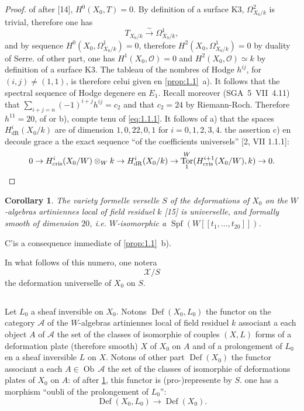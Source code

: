 \documentclass[12pt,a4paper]{article}
\theoremstyle{plain}
\newtheorem{corollary}[theorem]{Corollary}
\theoremstyle{definition}
\theoremstyle{remark}
\DeclareMathOperator{\Def}{Def}
\DeclareMathOperator{\Spf}{Spf}
\DeclareMathOperator{\Tor}{Tor}
\DeclareMathOperator{\Ob}{Ob}
\newcommand{\cris}{\mathrm{cris}}
\begin{document}
\begin{proof}
of after [14], $H^0(X_0, T) = 0$. By definition of a surface K3, $\Omega_{X_0/k}^2$ is trivial, therefore one has
\begin{equation}\label{eq:1.1.1}
T_{X_0/k} \xrightarrow{\sim} \Omega_{X_0/k}^1,
\end{equation}
and by sequence $H^0(X_0, \Omega_{X_0/k}^1) = 0$, therefore $H^2(X_0, \Omega_{X_0/k}^1) = 0$ by duality of Serre. of other part, one has $H^1(X_0, \mathcal{O}) = 0$ and $H^2(X_0, \mathcal{O}) \simeq k$ by definition of a surface K3. The tableau of the nombres of Hodge $h^{ij}$, for $(i,j) \neq (1,1)$, is therefore celui given en \ref{prop:1.1}~a). It follows that the spectral sequence of Hodge degenere en $E_1$. Recall moreover (SGA~5~VII~4.11) that $\sum_{i+j=n} (-1)^{i+j} h^{ij} = c_2$ and that $c_2 = 24$ by Riemann-Roch. Therefore $h^{11} = 20$, of or b), compte tenu of \eqref{eq:1.1.1}. It follows of a) that the spaces $H^i_{\mathrm{dR}}(X_0/k)$ are of dimension $1, 0, 22, 0, 1$ for $i = 0, 1, 2, 3, 4$. the assertion c) en decoule grace a the exact sequence ``of the coefficients universels'' [2, VII 1.1.1]:
\[
0 \to H^i_{\cris}(X_0/W) \otimes_W k \to H^i_{\mathrm{dR}}(X_0/k) \to \Tor^W_1(H^{i+1}_{\cris}(X_0/W), k) \to 0. \qedhere
\]
\end{proof}

\begin{corollary}\label{cor:1.2}
The variety formelle verselle $S$ of the deformations of $X_0$ on the $W$-algebras artiniennes local of field residuel $k$ [15] is universelle, and formally smooth of dimension $20$, i.e. $W$-isomorphic a $\Spf(W[[t_1, \ldots, t_{20}]])$.
\end{corollary}

C'is a consequence immediate of \ref{prop:1.1}~b).

In what follows of this numero, one notera
\begin{equation}\label{eq:1.3}
\mathcal{X}/S
\end{equation}
the deformation universelle of $X_0$ on $S$.

\subsection{}

Let $L_0$ a sheaf inversible on $X_0$. Notons $\Def(X_0, L_0)$ the functor on the category $\mathcal{A}$ of the $W$-algebras artiniennes local of field residuel $k$ associant a each object $A$ of $\mathcal{A}$ the set of the classes of isomorphie of couples $(X, L)$ forms of a deformation plate (therefore smooth) $X$ of $X_0$ on $A$ and of a prolongement of $L_0$ en a sheaf inversible $L$ on $X$. Notons of other part $\Def(X_0)$ the functor associant a each $A \in \Ob\,\mathcal{A}$ the set of the classes of isomorphie of deformations plates of $X_0$ on $A$: of after \ref{cor:1.2}, this functor is (pro-)represente by $S$. one has a morphism ``oubli of the prolongement of $L_0$'':
\begin{equation}\label{eq:1.4.1}
\Def(X_0, L_0) \to \Def(X_0).
\end{equation}
\end{document}
